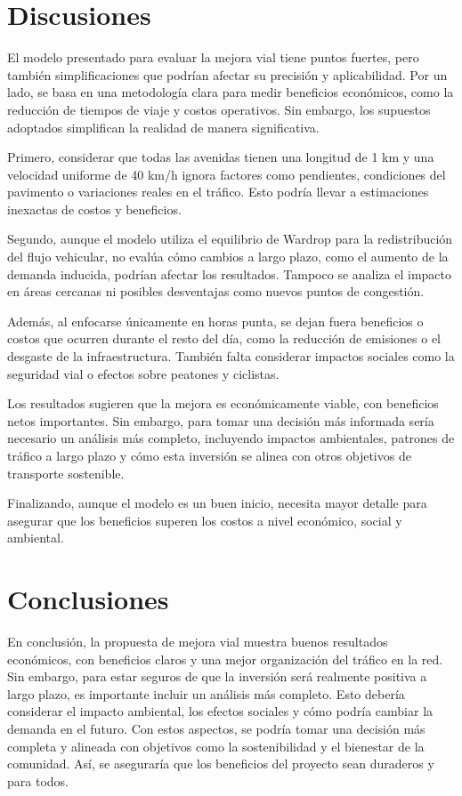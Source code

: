 \documentclass[letterpaper,12pt]{article}
\begin{document}
\newpage

\section{Discusiones}

El modelo presentado para evaluar la mejora vial tiene puntos fuertes, pero también simplificaciones que podrían afectar su precisión y aplicabilidad. Por un lado, se basa en una metodología clara para medir beneficios económicos, como la reducción de tiempos de viaje y costos operativos. Sin embargo, los supuestos adoptados simplifican la realidad de manera significativa.

Primero, considerar que todas las avenidas tienen una longitud de 1 km y una velocidad uniforme de 40 km/h ignora factores como pendientes, condiciones del pavimento o variaciones reales en el tráfico. Esto podría llevar a estimaciones inexactas de costos y beneficios.

Segundo, aunque el modelo utiliza el equilibrio de Wardrop para la redistribución del flujo vehicular, no evalúa cómo cambios a largo plazo, como el aumento de la demanda inducida, podrían afectar los resultados. Tampoco se analiza el impacto en áreas cercanas ni posibles desventajas como nuevos puntos de congestión.

Además, al enfocarse únicamente en horas punta, se dejan fuera beneficios o costos que ocurren durante el resto del día, como la reducción de emisiones o el desgaste de la infraestructura. También falta considerar impactos sociales como la seguridad vial o efectos sobre peatones y ciclistas.

Los resultados sugieren que la mejora es económicamente viable, con beneficios netos importantes. Sin embargo, para tomar una decisión más informada sería necesario un análisis más completo, incluyendo impactos ambientales, patrones de tráfico a largo plazo y cómo esta inversión se alinea con otros objetivos de transporte sostenible.

Finalizando, aunque el modelo es un buen inicio, necesita mayor detalle para asegurar que los beneficios superen los costos a nivel económico, social y ambiental.

\newpage

\section{Conclusiones}

En conclusión, la propuesta de mejora vial muestra buenos resultados económicos, con beneficios claros y una mejor organización del tráfico en la red. Sin embargo, para estar seguros de que la inversión será realmente positiva a largo plazo, es importante incluir un análisis más completo. Esto debería considerar el impacto ambiental, los efectos sociales y cómo podría cambiar la demanda en el futuro. Con estos aspectos, se podría tomar una decisión más completa y alineada con objetivos como la sostenibilidad y el bienestar de la comunidad. Así, se aseguraría que los beneficios del proyecto sean duraderos y para todos.
\end{document}
